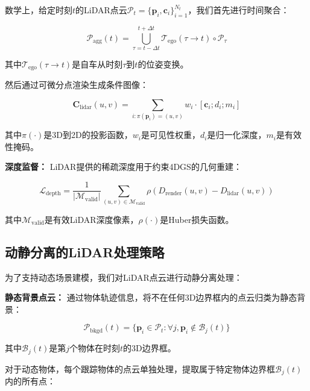 数学上，给定时刻$t$的LiDAR点云$\mathcal{P}_t = \{\mathbf{p}_i, \mathbf{c}_i\}_{i=1}^{N_t}$，我们首先进行时间聚合：

\begin{equation}
\mathcal{P}_{\text{agg}}(t) = \bigcup_{\tau=t-\Delta t}^{t+\Delta t} \mathcal{T}_{\text{ego}}(\tau \rightarrow t) \circ \mathcal{P}_\tau
\label{eq:lidar_aggregation}
\end{equation}

其中$\mathcal{T}_{\text{ego}}(\tau \rightarrow t)$是自车从时刻$\tau$到$t$的位姿变换。

然后通过可微分点渲染生成条件图像：

\begin{equation}
\mathbf{C}_{\text{lidar}}(u,v) = \sum_{i: \pi(\mathbf{p}_i) = (u,v)} w_i \cdot [\mathbf{c}_i; d_i; m_i]
\label{eq:lidar_condition_generation}
\end{equation}

其中$\pi(\cdot)$是3D到2D的投影函数，$w_i$是可见性权重，$d_i$是归一化深度，$m_i$是有效性掩码。

\textbf{深度监督：}
LiDAR提供的稀疏深度用于约束4DGS的几何重建：

\begin{equation}
\mathcal{L}_{\text{depth}} = \frac{1}{|\mathcal{M}_{\text{valid}}|} \sum_{(u,v) \in \mathcal{M}_{\text{valid}}} \rho(D_{\text{render}}(u,v) - D_{\text{lidar}}(u,v))
\label{eq:depth_supervision}
\end{equation}

其中$\mathcal{M}_{\text{valid}}$是有效LiDAR深度像素，$\rho(\cdot)$是Huber损失函数。

\subsection{动静分离的LiDAR处理策略}

为了支持动态场景建模，我们对LiDAR点云进行动静分离处理：

\textbf{静态背景点云：}
通过物体轨迹信息，将不在任何3D边界框内的点云归类为静态背景：

\begin{equation}
\mathcal{P}_{\text{bkgd}}(t) = \{\mathbf{p}_i \in \mathcal{P}_t : \forall j, \mathbf{p}_i \notin \mathcal{B}_j(t)\}
\label{eq:background_points}
\end{equation}

其中$\mathcal{B}_j(t)$是第$j$个物体在时刻$t$的3D边界框。

对于动态物体，每个跟踪物体的点云单独处理，提取属于特定物体边界框$\mathcal{B}_j(t)$内的所有点：

